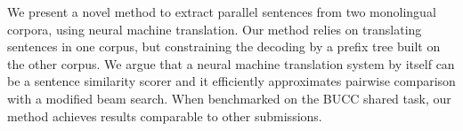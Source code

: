 We present a novel method to extract parallel sentences from two monolingual corpora, using neural machine translation. Our method relies on translating sentences in one corpus, but constraining the decoding by a prefix tree built on the other corpus. We argue that a neural machine translation system by itself can be a sentence similarity scorer and it efficiently approximates pairwise comparison with a modified beam search. When benchmarked on the BUCC shared task, our method achieves results comparable to other submissions.
